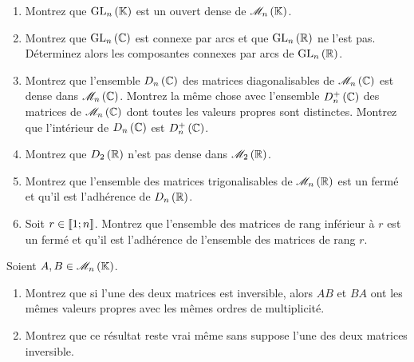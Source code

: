 \begin{corr}
\end{corr}

\begin{exoss}[Exercice 28]
\begin{enumerate}
    \item Montrez que \(\GL{n}\) est un ouvert dense de \(\M{n}\). \\
    \item Montrez que \(\GL{n}[\C]\) est connexe par arcs et que \(\GL{n}[\R]\) ne l'est pas. Déterminez alors les composantes connexes par arcs de \(\GL{n}[\R]\). \\
    \item Montrez que l'ensemble \(D_n\left(\mathbb{C}\right)\) des matrices diagonalisables de \(\M{n}[\C]\) est dense dans \(\M{n}[\C]\). Montrez la même chose avec l'ensemble \(D_n^+\left(\mathbb{C}\right)\) des matrices de \(\M{n}[\C]\) dont toutes les valeurs propres sont distinctes. Montrez que l'intérieur de \(D_n\left(\mathbb{C}\right)\) est \(D_n^+\left(\mathbb{C}\right)\). \\
    \item Montrez que \(D_2\left(\mathbb{R}\right)\) n'est pas dense dans \(\M{2}[\R]\). \\
    \item Montrez que l'ensemble des matrices trigonalisables de \(\M{n}[\R]\) est un fermé et qu'il est l'adhérence de \(D_n\left(\mathbb{R}\right)\). \\
    \item Soit \(r\in\left\llbracket1;n\right\rrbracket\). Montrez que l'ensemble des matrices de rang inférieur à \(r\) est un fermé et qu'il est l'adhérence de l'ensemble des matrices de rang \(r\).
\end{enumerate}
\end{exoss}

\begin{corr}
\end{corr}

\begin{exosss}[Exercice 29]
Soient \(A,B\in\M{n}\).

\begin{enumerate}
    \item Montrez que si l'une des deux matrices est inversible, alors \(AB\) et \(BA\) ont les mêmes valeurs propres avec les mêmes ordres de multiplicité. \\
    \item Montrez que ce résultat reste vrai même sans suppose l'une des deux matrices inversible.
\end{enumerate}
\end{exosss}


